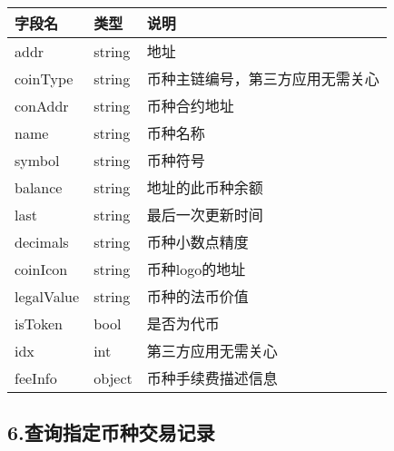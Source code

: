 \documentclass[letterpaper,10pt,english]{sphinxmanual}
\begin{document}


\begin{savenotes}\sphinxattablestart
\centering
\begin{tabulary}{\linewidth}[t]{|T|T|T|}
\hline
\sphinxstyletheadfamily 
字段名
&\sphinxstyletheadfamily 
类型
&\sphinxstyletheadfamily 
说明
\\
\hline
addr
&
string
&
地址
\\
\hline
coinType
&
string
&
币种主链编号，第三方应用无需关心
\\
\hline
conAddr
&
string
&
币种合约地址
\\
\hline
name
&
string
&
币种名称
\\
\hline
symbol
&
string
&
币种符号
\\
\hline
balance
&
string
&
地址的此币种余额
\\
\hline
last
&
string
&
最后一次更新时间
\\
\hline
decimals
&
string
&
币种小数点精度
\\
\hline
coinIcon
&
string
&
币种logo的地址
\\
\hline
legalValue
&
string
&
币种的法币价值
\\
\hline
isToken
&
bool
&
是否为代币
\\
\hline
idx
&
int
&
第三方应用无需关心
\\
\hline
feeInfo
&
object
&
币种手续费描述信息
\\
\hline
\end{tabulary}
\par
\sphinxattableend\end{savenotes}


\begin{sphinxVerbatim}[commandchars=\\\{\}]
     
\end{sphinxVerbatim}


\subsection{6.查询指定币种交易记录}
\label{\detokenize{BCBWalletSDK_u63a5_u53e3_u8bf4_u660e:id75}}
\end{document}
